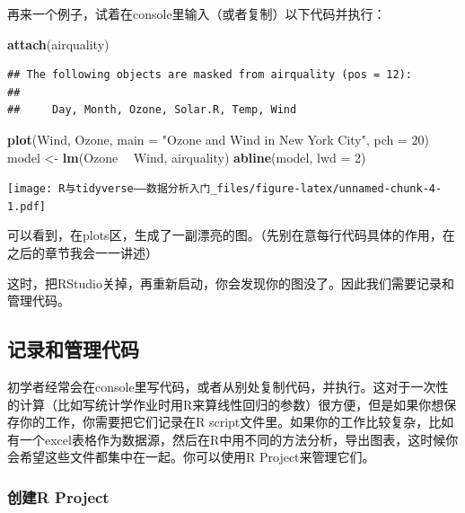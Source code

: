 \documentclass[]{book}
\newenvironment{Shaded}{\begin{snugshade}}{\end{snugshade}}
\newcommand{\DataTypeTok}[1]{\textcolor[rgb]{0.13,0.29,0.53}{#1}}
\newcommand{\DecValTok}[1]{\textcolor[rgb]{0.00,0.00,0.81}{#1}}
\newcommand{\KeywordTok}[1]{\textcolor[rgb]{0.13,0.29,0.53}{\textbf{#1}}}
\newcommand{\NormalTok}[1]{#1}
\newcommand{\OperatorTok}[1]{\textcolor[rgb]{0.81,0.36,0.00}{\textbf{#1}}}
\newcommand{\StringTok}[1]{\textcolor[rgb]{0.31,0.60,0.02}{#1}}
\begin{document}
再来一个例子，试着在console里输入（或者复制）以下代码并执行：

\begin{Shaded}
\begin{Highlighting}[]
\KeywordTok{attach}\NormalTok{(airquality)}
\end{Highlighting}
\end{Shaded}

\begin{verbatim}
## The following objects are masked from airquality (pos = 12):
## 
##     Day, Month, Ozone, Solar.R, Temp, Wind
\end{verbatim}

\begin{Shaded}
\begin{Highlighting}[]
\KeywordTok{plot}\NormalTok{(Wind, Ozone, }\DataTypeTok{main =} \StringTok{"Ozone and Wind in New York City"}\NormalTok{, }\DataTypeTok{pch =} \DecValTok{20}\NormalTok{)}
\NormalTok{model <-}\StringTok{ }\KeywordTok{lm}\NormalTok{(Ozone }\OperatorTok{~}\StringTok{ }\NormalTok{Wind, airquality)}
\KeywordTok{abline}\NormalTok{(model, }\DataTypeTok{lwd =} \DecValTok{2}\NormalTok{)}
\end{Highlighting}
\end{Shaded}

\texttt{[image: R与tidyverse——数据分析入门\_files/figure-latex/unnamed-chunk-4-1.pdf]}

可以看到，在plots区，生成了一副漂亮的图。（先别在意每行代码具体的作用，在之后的章节我会一一讲述）

这时，把RStudio关掉，再重新启动，你会发现你的图没了。因此我们需要记录和管理代码。

\hypertarget{manage}{%
\subsection{记录和管理代码}\label{manage}}

初学者经常会在console里写代码，或者从别处复制代码，并执行。这对于一次性的计算（比如写统计学作业时用R来算线性回归的参数）很方便，但是如果你想保存你的工作，你需要把它们记录在R script文件里。如果你的工作比较复杂，比如有一个excel表格作为数据源，然后在R中用不同的方法分析，导出图表，这时候你会希望这些文件都集中在一起。你可以使用R Project来管理它们。

\hypertarget{r-project}{%
\subsubsection{创建R Project}\label{r-project}}
\end{document}
